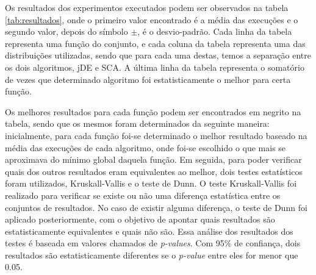 
Os resultados dos experimentos executados podem ser observados na tabela \ref{tab:resultados}, onde o primeiro valor encontrado é a média das execuções e o segundo valor, depois do símbolo $\pm$, é o desvio-padrão. Cada linha da tabela representa uma função do conjunto, e cada coluna da tabela representa uma das distribuições utilizadas, sendo que para cada uma destas, temos a separação entre os dois algoritmos, jDE e SCA. A última linha da tabela representa o somatório de vezes que determinado algoritmo foi estatisticamente o melhor para certa função.

Os melhores resultados para cada função podem ser encontrados em negrito na tabela, sendo que os mesmos foram determinados da seguinte maneira: inicialmente, para cada função foi-se determinado o melhor resultado baseado na média das execuções de cada algoritmo, onde foi-se escolhido o que mais se aproximava do mínimo global daquela função. Em seguida, para poder verificar quais dos outros resultados eram equivalentes ao melhor, dois testes estatísticos foram utilizados, Kruskall-Vallis e o teste de Dunn. O teste Kruskall-Vallis foi realizado para verificar se existe ou não uma diferença estatística entre os conjuntos de resultados. No caso de existir alguma diferença, o teste de Dunn foi aplicado posteriormente, com o objetivo de apontar quais resultados são estatisticamente equivalentes e quais não são. Essa análise dos resultados dos testes é baseada em valores chamados de \textit{p-values}. Com 95\% de confiança, dois resultados são estatisticamente diferentes se o \textit{p-value} entre eles for menor que 0.05.

